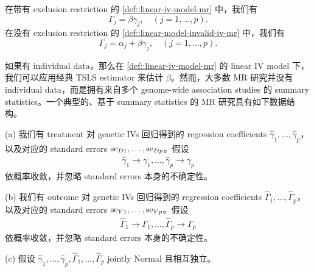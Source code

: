 在带有 exclusion restriction 的 \cref{def::linear-iv-model-mr} 中，我们有
$$
\Gamma_j = \beta \gamma_j,\quad (j=1,\ldots,p).
$$
在没有 exclusion restriction 的 \cref{def::linear-model-invalid-iv-mr} 中，我们有
$$
\Gamma_j = \alpha_j +   \beta \gamma_j,\quad (j=1,\ldots,p). 
$$



如果有 individual data，那么在 \cref{def::linear-iv-model-mr} 的 linear IV model 下，我们可以应用经典 TSLS estimator 来估计 $\beta$。然而，大多数 MR 研究并没有 individual data，而是拥有来自多个 genome-wide association studies 的 summary statistics。一个典型的、基于 summary statistics 的 MR 研究具有如下数据结构。


\begin{assumption}
\label{assume::MR-summary}
(a)
我们有 treatment 对 genetic IVs 回归得到的 regression coefficients $\hat{\gamma}_1   , \ldots, \hat{\gamma}_p$，以及对应的 standard errors $\textup{se}_{D1}, \ldots, \textup{se}_{Dp}$。假设
\begin{eqnarray}
\label{eq::small-gammas}
\hat{\gamma}_1  \rightarrow \gamma_1 , \ldots, \hat{\gamma}_p \rightarrow \gamma_p
\end{eqnarray}
依概率收敛，并忽略 standard errors 本身的不确定性。

(b)
我们有 outcome 对 genetic IVs 回归得到的 regression coefficients $\hat{\Gamma}_1   , \ldots, \hat{\Gamma}_p$，以及对应的 standard errors $\textup{se}_{Y1}, \ldots, \textup{se}_{Yp}$。假设
\begin{eqnarray}
\label{eq::big-gammas}
\hat{\Gamma}_1 \rightarrow \Gamma_1 , \ldots, \hat{\Gamma}_p \rightarrow \Gamma_p
\end{eqnarray}
依概率收敛，并忽略 standard errors 本身的不确定性。

(c)
假设 $\hat{\gamma}_1   , \ldots, \hat{\gamma}_p, \hat{\Gamma}_1   , \ldots, \hat{\Gamma}_p$ jointly Normal 且相互独立。
\end{assumption}




